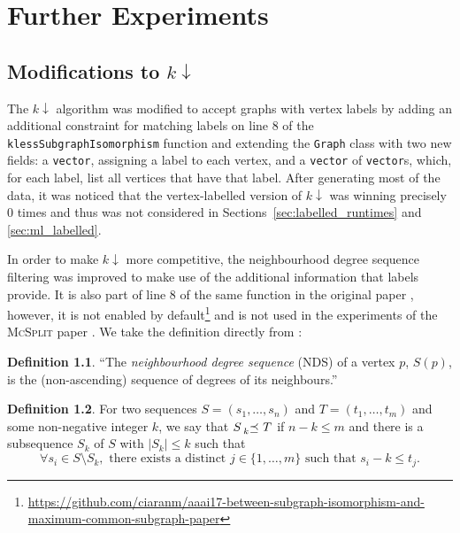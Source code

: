 \documentclass{l4proj}
\theoremstyle{definition}
\newtheorem{definition}{Definition}[chapter]
\theoremstyle{remark}
\newcommand{\kprec}[1]{\prescript{}{#1}{\preceq}\ }
\begin{document}
\chapter{Further Experiments}

\section{Modifications to \texorpdfstring{$k{\downarrow}$}{kdown}}

The $k{\downarrow}$ algorithm was modified to accept graphs with vertex
labels by adding an additional constraint for matching labels on line 8 of the
\texttt{klessSubgraphIsomorphism} function \cite{DBLP:conf/aaai/HoffmannMR17}
and extending the \texttt{Graph} class with two new fields: a \texttt{vector},
assigning a label to each vertex, and a \texttt{vector} of \texttt{vector}s,
which, for each label, list all vertices that have that label. After generating
most of the data, it was noticed that the vertex-labelled version of
$k{\downarrow}$ was winning precisely 0 times and thus was not considered in
Sections~\ref{sec:labelled_runtimes} and \ref{sec:ml_labelled}.

In order to make $k{\downarrow}$ more competitive, the neighbourhood degree
sequence filtering was improved to make use of the additional information that
labels provide. It is also part of line 8 of the same function in the original
paper \cite{DBLP:conf/aaai/HoffmannMR17}, however, it is not enabled by
default\footnote{\url{https://github.com/ciaranm/aaai17-between-subgraph-isomorphism-and-maximum-common-subgraph-paper}}
and is not used in the experiments of the \textsc{McSplit} paper
\cite{DBLP:conf/ijcai/McCreeshPT17}. We take the definition directly from
\cite{DBLP:conf/aaai/HoffmannMR17}:

\begin{definition}
  ``The \emph{neighbourhood degree sequence} (NDS) of a vertex $p$, $S(p)$, is the
  (non-ascending) sequence of degrees of its neighbours.''
\end{definition}

\begin{definition} \label{def:prec}
  For two sequences $S = (s_1, \dots, s_n)$ and $T = (t_1, \dots, t_m)$ and some
  non-negative integer $k$, we say that $S \kprec{k} T$ if $n - k \le m$ and
  there is a subsequence $S_k$ of $S$ with $|S_k| \le k$ such that
  \cite{DBLP:conf/aaai/HoffmannMR17}
  \[ \forall s_i \in S \setminus S_k, \text{ there exists a distinct } j \in \{
    1, \dots, m \} \text{ such that } s_i - k \le t_j. \]
\end{definition}
\end{document}
